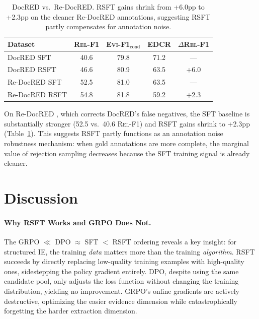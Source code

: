 \documentclass[11pt,a4paper]{article}
\newcommand{\evi}{\textsc{Evi-F1}}
\newcommand{\edcr}{\textsc{EDCR}}
\newcommand{\relf}{\textsc{Rel-F1}}
\begin{document}
\begin{table}[t]
\centering
\small
\begin{tabular}{lcccc}
\toprule
\textbf{Dataset} & \textbf{\relf{}} & \textbf{\evi{}$_\text{cond}$} & \textbf{\edcr{}} & \textbf{$\Delta$\relf{}} \\
\midrule
DocRED SFT & 40.6 & 79.8 & 71.2 & --- \\
DocRED RSFT & 46.6 & 80.9 & 63.5 & +6.0 \\
\midrule
Re-DocRED SFT & 52.5 & 81.0 & 63.5 & --- \\
Re-DocRED RSFT & 54.8 & 81.8 & 59.2 & +2.3 \\
\bottomrule
\end{tabular}
\caption{DocRED vs.\ Re-DocRED. RSFT gains shrink from +6.0pp to +2.3pp on the cleaner Re-DocRED annotations, suggesting RSFT partly compensates for annotation noise.}
\label{tab:redocred}
\end{table}

On Re-DocRED \cite{tan2022revisiting}, which corrects DocRED's false negatives, the SFT baseline is substantially stronger (52.5 vs.\ 40.6 \relf{}) and RSFT gains shrink to +2.3pp (Table~\ref{tab:redocred}). This suggests RSFT partly functions as an annotation noise robustness mechanism: when gold annotations are more complete, the marginal value of rejection sampling decreases because the SFT training signal is already cleaner.

\section{Discussion}
\label{sec:discussion}

\paragraph{Why RSFT Works and GRPO Does Not.}
The GRPO $\ll$ DPO $\approx$ SFT $<$ RSFT ordering reveals a key insight: for structured IE, the training \textit{data} matters more than the training \textit{algorithm}. RSFT succeeds by directly replacing low-quality training examples with high-quality ones, sidestepping the policy gradient entirely. DPO, despite using the same candidate pool, only adjusts the loss function without changing the training distribution, yielding no improvement. GRPO's online gradients are actively destructive, optimizing the easier evidence dimension while catastrophically forgetting the harder extraction dimension.
\end{document}
